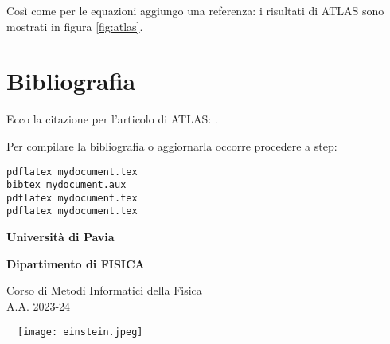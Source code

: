 \documentclass[a4paper, 12pt]{article} %
\begin{document}
Così come per le equazioni aggiungo una referenza: i risultati di ATLAS sono mostrati in figura \ref{fig:atlas}.

\section{Bibliografia}



Ecco la citazione per l'articolo di ATLAS: \cite{Aad_2012}.

Per compilare la bibliografia o aggiornarla occorre procedere a step:

\begin{verbatim}
pdflatex mydocument.tex
bibtex mydocument.aux
pdflatex mydocument.tex
pdflatex mydocument.tex
\end{verbatim}







\pagebreak


\thispagestyle{empty}



\begin{minipage}[b]{0.5\textwidth}

  \sffamily %
  \textbf{Università di Pavia}
  
  \vspace{0.1cm}
  
  \textbf{Dipartimento di FISICA}
  
  \vspace{0.4cm}

  \begin{flushright}
  
    Corso di Metodi Informatici della Fisica \\
    A.A. 2023-24

  \end{flushright}

\end{minipage}
\begin{minipage}[b]{0.48\textwidth}
  $\quad$\texttt{[image: einstein.jpeg]}
\end{minipage}
\end{document}
